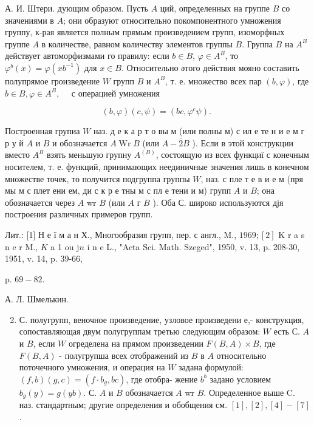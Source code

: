 \documentclass[10pt]{article}
\begin{document}
А. И. Штери. дующим образом. Пусть $A$ ций, определенных на группе $B$ со значениями в $A$; они образуют относительно покомпонентного умножения группу, к-рая является полным прямым произведением групп, изоморфных группе $A$ в количестве, равном количеству элементов группы $B$. Группа $B$ на $A^{B}$ действует автоморфизмами го правилу: если $b \in B$, $\varphi \in A^{B}$, то $\varphi^{b}(x)=\varphi\left(x b^{-1}\right)$ для $x \in B$. Относительно әтого действия мояно составить полупрямое гроизведение $W$ групп $B$ и $A^{B}$, т. е. множество всех пар $(b, \varphi)$, где $b \in B, \varphi \in A^{B}, \quad$ с операцией умножения



\[

(b, \varphi)(c, \psi)=\left(b c, \varphi^{c} \psi\right) \text {. }

\]



Построенная групиа $W$ наз. д е к а р т о вы м (или полны м) с ил е те н и е м г р у й $A$ и $B$ и обозначается $A \operatorname{Wr} B$ (или $A-\overline{2} B$ ). Если в этой конструкции вместо $A^{B}$ взять меньшую групну $A^{(B)}$, состоящую из всех функциї с конечным носителем, т. е. функций, принимающих неединичные значения лишь в конечном множестве точек, то получится подгруппа группы $W$, наз. с пле т е в и е м (пря мы м с плет ени ем, ди с к р е тны м с пл е тени и м) групп $A$ и $B$; она обозначается через $A$ wr $B$ (или $A$ г $B$ ). Оба С. широко используются дјя построения различных примеров групп.



Лит.: [1] Н е ї м а н Х., Многообразия групп, пер. с англ., M., $1969 ;[2]$ K r a s n e r M., $K$ a 1 ou $\mathrm{j} n$ i n e L., "Acta Sci. Math. Szeged", 1950, v. 13, p. 208-30, 1951, v. 14, p. 39-66,

p. $69-82$.

А. Л. Шмелькин.



\begin{enumerate}

  \setcounter{enumi}{1}

  \item С. полугрупп, веночное произведение, узловое произведени е,- конструкция, сопоставляющая двум полугруппам третью следующим образом: $W$ есть С. $A$ и $B$, если $W$ огределена на прямом произведении $F(B, A) \times B$, где $F(B, A)$ - полугрупша всех отображений из $B$ в $A$ относительно поточечного умножения, и операция на $W$ задана формулой: $(f, b)(g, c)=\left(f \cdot b_{g}, b c\right)$, где отобра- жение $b^{b}$ задано условием $b_{g}(y)=g(y b)$. С. $A$ и $B$ обозначается $A$ wr $B$. Определенное выше C. наз. стандартным; другие определения и обобщения см. $[1],[2],[4]-[7]$.

\end{enumerate}
\end{document}
